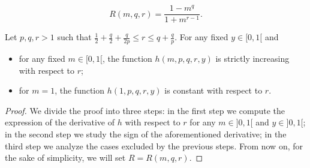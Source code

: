 \documentclass[10pt,a4paper]{amsart}
\begin{document}
\begin{equation}\label{Rdef}
R(m,q,r)=\frac{1-m^q}{1+m^{r-1}}.
\end{equation}

\begin{lem}
\label{prop-monotonia-r}
Let $p,q,r>1$ such that $\frac 12+\frac q2 +\frac q{2p}\le r \le q+\frac q p$.  For any fixed $y\in[0,1[$ and
\begin{itemize}
\item for any fixed $m\in[0,1[$, the function $h(m,p,q,r,y)$ is strictly increasing with respect to $r$;
\item for $m=1$, the function $h(1,p,q,r,y)$ is constant with respect to $r$. 
\end{itemize}
\end{lem}

\begin{proof} We divide the proof into three steps: in the first step we compute the expression of the derivative of $h$ with respect to $r$ for any $m\in]0,1[$ and $y\in]0,1[$; in the second step we study the sign of the aforementioned derivative; in the third step we analyze the cases excluded by the previous steps. From now on, for the sake of simplicity, we will set  $R=R(m,q,r)$.


\end{proof}
\end{document}
